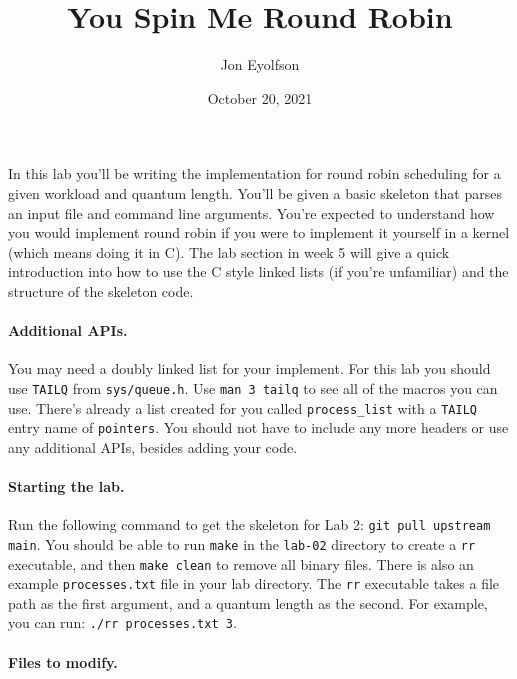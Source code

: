 

\title{You Spin Me Round Robin}
\author{Jon Eyolfson}
\date{October 20, 2021}



\maketitle

In this lab you'll be writing the implementation for round robin scheduling
for a given workload and quantum length.
You'll be given a basic skeleton that parses an input file and command line
arguments.
You're expected to understand how you would implement round robin if you were
to implement it yourself in a kernel (which means doing it in C).
The lab section in week 5 will give a quick introduction into how to use the
C style linked lists (if you're unfamiliar) and the structure of the skeleton
code.

\paragraph{Additional APIs.}

You may need a doubly linked list for your implement.
For this lab you should use \texttt{TAILQ} from \texttt{sys/queue.h}.
Use \texttt{man 3 tailq} to see all of the macros you can use.
There's already a list created for you called \texttt{process\_list} with a
\texttt{TAILQ} entry name of \texttt{pointers}.
You should not have to include any more headers or use any additional APIs,
besides adding your code.

\paragraph{Starting the lab.}

Run the following command to get the skeleton for Lab 2:
\texttt{git pull upstream main}.
You should be able to run \texttt{make} in the \texttt{lab-02} directory to
create a \texttt{rr} executable, and then \texttt{make clean} to remove all
binary files.
There is also an example \texttt{processes.txt} file in your lab directory.
The \texttt{rr} executable takes a file path as the first argument, and a
quantum length as the second.
For example, you can run: \texttt{./rr processes.txt 3}.

\paragraph{Files to modify.}

